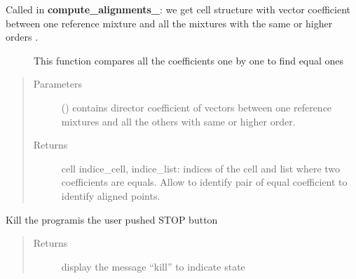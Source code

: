 \documentclass[letterpaper,10pt,english]{sphinxmanual}
\begin{document}
\begin{fulllineitems}
\label{\detokenize{ExperimentsPlannification:modules.index_alignments}}\begin{description}
\item[{Called in {\color{red}\bfseries{}\textasciigrave{}compute\_alignments\textasciigrave{}\_}: we get cell structure with vector coefficient between one reference mixture and all the mixtures with the same or higher orders .}] \leavevmode
\sphinxAtStartPar
This function compares all the coefficients one by one to find equal ones

\end{description}
\begin{quote}\begin{description}
\item[{Parameters}] \leavevmode
\sphinxAtStartPar
{} () \textendash{} contains director coefficient of vectors between one reference mixtures and all the others with same or higher order.

\item[{Returns}] \leavevmode
\sphinxAtStartPar
cell indice\_cell, indice\_list: indices of the cell and list where two coefficients are equals. Allow to identify pair of equal coefficient to identify aligned points.

\end{description}\end{quote}

\end{fulllineitems}

\label{\detokenize{ExperimentsPlannification:module-modules}}

\begin{fulllineitems}
\label{\detokenize{ExperimentsPlannification:modules.kill_program}}
\sphinxAtStartPar
Kill the programis the user pushed STOP button
\begin{quote}\begin{description}
\item[{Returns}] \leavevmode
\sphinxAtStartPar
display the message “kill” to indicate state

\end{description}\end{quote}

\end{fulllineitems}
\end{document}
